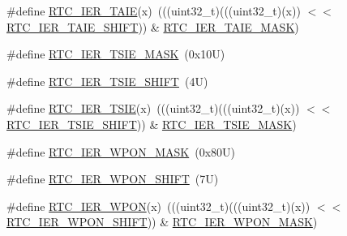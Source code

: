 \begin{DoxyCompactItemize}
\item 
\#define \mbox{\hyperlink{group___r_t_c___register___masks_ga0c84f648183b728883a6f14d6e1e36c6}{R\+T\+C\+\_\+\+I\+E\+R\+\_\+\+T\+A\+IE}}(x)~(((uint32\+\_\+t)(((uint32\+\_\+t)(x)) $<$$<$ \mbox{\hyperlink{group___r_t_c___register___masks_gae15cd7098592da4c3a2c2563879ae5d8}{R\+T\+C\+\_\+\+I\+E\+R\+\_\+\+T\+A\+I\+E\+\_\+\+S\+H\+I\+FT}})) \& \mbox{\hyperlink{group___r_t_c___register___masks_gad1bcc4df9a637ec5ab4b611391986c06}{R\+T\+C\+\_\+\+I\+E\+R\+\_\+\+T\+A\+I\+E\+\_\+\+M\+A\+SK}})
\item 
\#define \mbox{\hyperlink{group___r_t_c___register___masks_ga63c8ae5db82845d5bb13907cd0e70cd7}{R\+T\+C\+\_\+\+I\+E\+R\+\_\+\+T\+S\+I\+E\+\_\+\+M\+A\+SK}}~(0x10\+U)
\item 
\#define \mbox{\hyperlink{group___r_t_c___register___masks_ga456ec6fb31112c122b38dcc586d9e75d}{R\+T\+C\+\_\+\+I\+E\+R\+\_\+\+T\+S\+I\+E\+\_\+\+S\+H\+I\+FT}}~(4\+U)
\item 
\#define \mbox{\hyperlink{group___r_t_c___register___masks_ga1bc67a85a822b7ad9ddb5aca49634471}{R\+T\+C\+\_\+\+I\+E\+R\+\_\+\+T\+S\+IE}}(x)~(((uint32\+\_\+t)(((uint32\+\_\+t)(x)) $<$$<$ \mbox{\hyperlink{group___r_t_c___register___masks_ga456ec6fb31112c122b38dcc586d9e75d}{R\+T\+C\+\_\+\+I\+E\+R\+\_\+\+T\+S\+I\+E\+\_\+\+S\+H\+I\+FT}})) \& \mbox{\hyperlink{group___r_t_c___register___masks_ga63c8ae5db82845d5bb13907cd0e70cd7}{R\+T\+C\+\_\+\+I\+E\+R\+\_\+\+T\+S\+I\+E\+\_\+\+M\+A\+SK}})
\item 
\#define \mbox{\hyperlink{group___r_t_c___register___masks_gae08d5bcb3d71bb932a7c1d41086b3545}{R\+T\+C\+\_\+\+I\+E\+R\+\_\+\+W\+P\+O\+N\+\_\+\+M\+A\+SK}}~(0x80\+U)
\item 
\#define \mbox{\hyperlink{group___r_t_c___register___masks_gaa18422218526a3bb50a3158c3aee2100}{R\+T\+C\+\_\+\+I\+E\+R\+\_\+\+W\+P\+O\+N\+\_\+\+S\+H\+I\+FT}}~(7\+U)
\item 
\#define \mbox{\hyperlink{group___r_t_c___register___masks_ga9cfc0e9a7e1a84c019ed8cde67c963d2}{R\+T\+C\+\_\+\+I\+E\+R\+\_\+\+W\+P\+ON}}(x)~(((uint32\+\_\+t)(((uint32\+\_\+t)(x)) $<$$<$ \mbox{\hyperlink{group___r_t_c___register___masks_gaa18422218526a3bb50a3158c3aee2100}{R\+T\+C\+\_\+\+I\+E\+R\+\_\+\+W\+P\+O\+N\+\_\+\+S\+H\+I\+FT}})) \& \mbox{\hyperlink{group___r_t_c___register___masks_gae08d5bcb3d71bb932a7c1d41086b3545}{R\+T\+C\+\_\+\+I\+E\+R\+\_\+\+W\+P\+O\+N\+\_\+\+M\+A\+SK}})
\end{DoxyCompactItemize}
